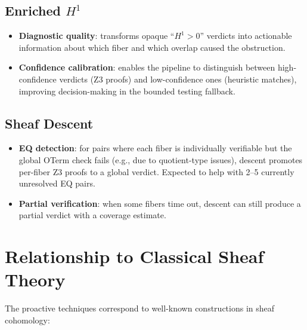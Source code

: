 \subsection{Enriched $H^1$}

\begin{itemize}
  \item \textbf{Diagnostic quality}: transforms opaque ``$H^1 > 0$''
    verdicts into actionable information about which fiber and
    which overlap caused the obstruction.
  \item \textbf{Confidence calibration}: enables the pipeline to
    distinguish between high-confidence verdicts (Z3 proofs) and
    low-confidence ones (heuristic matches), improving decision-making
    in the bounded testing fallback.
\end{itemize}

\subsection{Sheaf Descent}

\begin{itemize}
  \item \textbf{EQ detection}: for pairs where each fiber is
    individually verifiable but the global OTerm check fails (e.g.,
    due to quotient-type issues), descent promotes per-fiber Z3 proofs
    to a global verdict.  Expected to help with 2--5 currently
    unresolved EQ pairs.
  \item \textbf{Partial verification}: when some fibers time out,
    descent can still produce a partial verdict with a coverage
    estimate.
\end{itemize}


\section{Relationship to Classical Sheaf Theory}
\label{sec:classical}

The proactive techniques correspond to well-known constructions
in sheaf cohomology:

